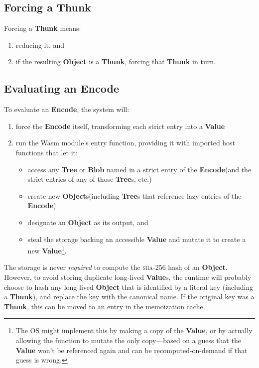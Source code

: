 \documentclass{article}
\newcommand{\blob}{\textbf{Blob}\xspace}
\newcommand{\valuex}{\textbf{Value}\xspace}
\newcommand{\valuexs}{\textbf{Value}s\xspace}
\newcommand{\object}{\textbf{Object}\xspace}
\newcommand{\objects}{\textbf{Object}s\xspace}
\newcommand{\encode}{\textbf{Encode}\xspace}
\newcommand{\thunk}{\textbf{Thunk}\xspace}
\newcommand{\tree}{\textbf{Tree}\xspace}
\newcommand{\trees}{\textbf{Tree}s\xspace}
\begin{document}
\subsection{Forcing a \thunk}

Forcing a \thunk means:
\begin{enumerate}[itemsep=0pt]
\item reducing it, and
\item if the resulting \object is a \thunk, forcing that \thunk in turn.
\end{enumerate}

\subsection{Evaluating an \encode}

To evaluate an \encode, the system will:
\begin{enumerate}[itemsep=0pt]
\item force the \encode itself, transforming each strict entry into a \valuex
\item run the Wasm module's entry function, providing it with imported host functions that let it:
\begin{itemize}[itemsep=0pt, topsep=0pt]
\item access any \tree or \blob named in a strict entry of the \encode (and the strict entries of any of those \trees, etc.)
\item create new \objects (including \trees that reference lazy entries of the \encode)
\item designate an \object as its output, and
\item steal the storage backing an accessible \valuex and mutate it to create a new \valuex\footnote{The OS
might implement this by making a copy of the \valuex, or by actually allowing
the function to mutate the only copy---based on a guess that the \valuex won't be referenced
again and can be recomputed-on-demand if that guess is wrong.}.
\end{itemize}
\end{enumerate}

The storage is never \emph{required} to compute the \textsc{sha-256} hash of an
\object. However, to avoid storing duplicate long-lived \valuexs, the
runtime will probably choose to hash any long-lived \object that is
identified by a literal key (including a \thunk), and replace the key
with the canonical name. If the original key was a \thunk, this can be
moved to an entry in the memoization cache.
\end{document}

